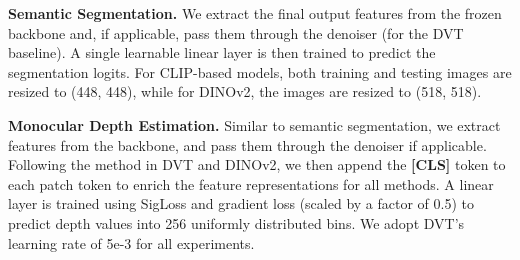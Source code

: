 \textbf{Semantic Segmentation.} We extract the final output features from the frozen backbone and, if applicable, pass them through the denoiser (for the DVT baseline). A single learnable linear layer is then trained to predict the segmentation logits. For CLIP-based models, both training and testing images are resized to (448, 448), while for DINOv2, the images are resized to (518, 518).

\textbf{Monocular Depth Estimation.}
Similar to semantic segmentation, we extract features from the backbone, and pass them through the denoiser if applicable. Following the method in DVT and DINOv2, we then append the \textbf{[CLS]} token to each patch token to enrich the feature representations for all methods. 
A linear layer is trained using SigLoss and gradient loss (scaled by a factor of 0.5) to predict depth values into 256 uniformly distributed bins. We adopt DVT's learning rate of 5e-3 for all experiments. 
